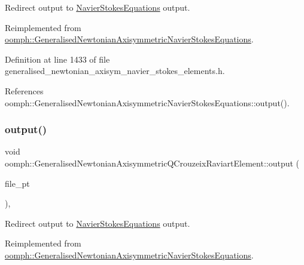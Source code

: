 Redirect output to \hyperlink{classoomph_1_1NavierStokesEquations}{Navier\+Stokes\+Equations} output. 



Reimplemented from \hyperlink{classoomph_1_1GeneralisedNewtonianAxisymmetricNavierStokesEquations_a7c80af0c22f64c3484cdeac1edcbe28c}{oomph\+::\+Generalised\+Newtonian\+Axisymmetric\+Navier\+Stokes\+Equations}.



Definition at line 1433 of file generalised\+\_\+newtonian\+\_\+axisym\+\_\+navier\+\_\+stokes\+\_\+elements.\+h.



References oomph\+::\+Generalised\+Newtonian\+Axisymmetric\+Navier\+Stokes\+Equations\+::output().

\mbox{\label{classoomph_1_1GeneralisedNewtonianAxisymmetricQCrouzeixRaviartElement_aa35348f142e702e3590bc28d5001d492}} 
\subsubsection{\texorpdfstring{output()}{output()}\hspace{0.1cm}{\footnotesize\ttfamily [3/4]}}
{\footnotesize\ttfamily void oomph\+::\+Generalised\+Newtonian\+Axisymmetric\+Q\+Crouzeix\+Raviart\+Element\+::output (\begin{DoxyParamCaption}\item[{F\+I\+LE $\ast$}]{file\+\_\+pt }\end{DoxyParamCaption})\hspace{0.3cm}{\ttfamily [inline]}, {\ttfamily [virtual]}}



Redirect output to \hyperlink{classoomph_1_1NavierStokesEquations}{Navier\+Stokes\+Equations} output. 



Reimplemented from \hyperlink{classoomph_1_1GeneralisedNewtonianAxisymmetricNavierStokesEquations_a34a51e3ad73df1ddca173e59a1404c90}{oomph\+::\+Generalised\+Newtonian\+Axisymmetric\+Navier\+Stokes\+Equations}.



